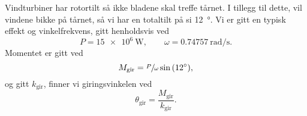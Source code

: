 Vindturbiner har rotortilt så ikke bladene skal treffe tårnet.
I tillegg til dette, vil vindene bikke på tårnet, så vi har en totaltilt på si \SI{12}{\degree}.
Vi er gitt en typisk effekt og vinkelfrekvens, gitt henholdsvis ved
\[
        P = \SI{15e6}{\watt}, \qquad \omega = \SI{0.74757}{\radian\per\second}.
\]
Momentet er gitt ved
\[
        M_{\mathrm{gir}} = \sfrac{P}{\omega}\sin{(\SI{12}{\degree})},
\]
og gitt $k_{\mathrm{gir}}$, finner vi giringsvinkelen ved
\[
        \theta_{\mathrm{gir}} = \frac{M_{\mathrm{gir}}}{k_{\mathrm{gir}}}.
\]

